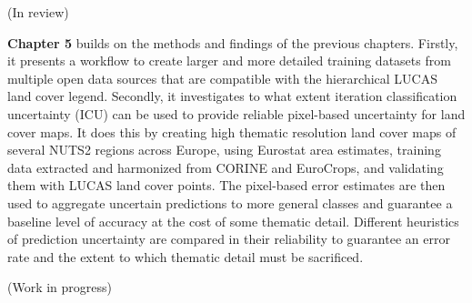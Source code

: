 (In review)

\textbf{Chapter 5} builds on the methods and findings of the previous chapters. 
Firstly, it presents a workflow to create larger and more detailed training datasets from multiple open data sources that are compatible with the hierarchical LUCAS land cover legend. 
Secondly, it investigates to what extent iteration classification uncertainty (ICU) can be used to provide reliable pixel-based uncertainty for land cover maps. It does this by creating high thematic resolution land cover maps of several NUTS2 regions across Europe, using Eurostat area estimates, training data extracted and harmonized from CORINE and EuroCrops, and validating them with LUCAS land cover points. 
The pixel-based error estimates are then used to aggregate uncertain predictions to more general classes and guarantee a baseline level of accuracy at the cost of some thematic detail. Different heuristics of prediction uncertainty are compared in their reliability to guarantee an error rate and the extent to which thematic detail must be sacrificed.

(Work in progress)